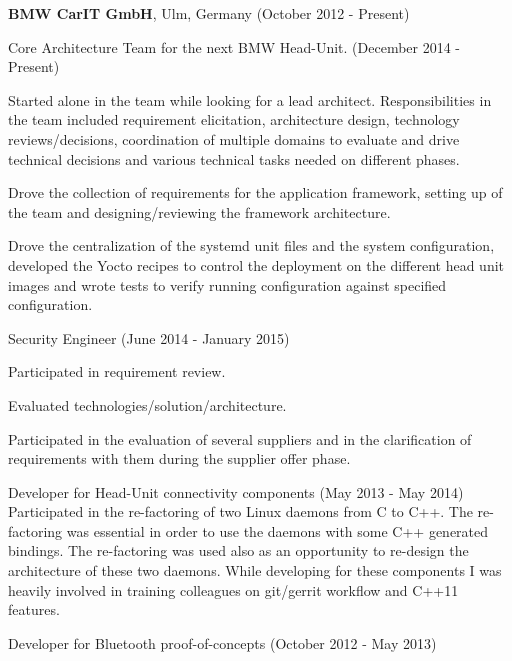 \documentclass[alan.tex]{subfiles}
\begin{document}
  \item \textbf{BMW CarIT GmbH}, Ulm, Germany (October 2012 - Present)
    \begin{my_desc}
      \item[Core Architecture Team] for the next BMW Head-Unit. (December 2014 - Present)
        \begin{my_bullets}
          \item Started alone in the team while looking for a lead architect. Responsibilities in the team
            included requirement elicitation, architecture design, technology reviews/decisions,
            coordination of multiple domains to evaluate and drive technical decisions and various
            technical tasks needed on different phases.
          \item Drove the collection of requirements for the application framework, setting up of the team
            and designing/reviewing the framework architecture.
          \item Drove the centralization of the systemd unit files and the system configuration, developed the
            Yocto recipes to control the deployment on the different head unit images and wrote tests to
            verify running configuration against specified configuration.
        \end{my_bullets}
      \item[Security Engineer] (June 2014 - January 2015)
        \begin{my_bullets}
          \item Participated in requirement review.
          \item Evaluated technologies/solution/architecture.
          \item Participated in the evaluation of several suppliers and in the clarification of requirements with
            them during the supplier offer phase.
        \end{my_bullets}
      \item[Developer] for Head-Unit connectivity components (May 2013 - May 2014)
        Participated in the re-factoring of two Linux daemons from C to C++. The re-factoring was essential
        in order to use the daemons with some C++ generated bindings. The re-factoring was used also as an opportunity
        to re-design the architecture of these two daemons.
        While developing for these components I was heavily involved in training colleagues on git/gerrit workflow and C++11 features.
      \item[Developer] for Bluetooth proof-of-concepts (October 2012 - May 2013)

\end{my_desc}
\end{document}
